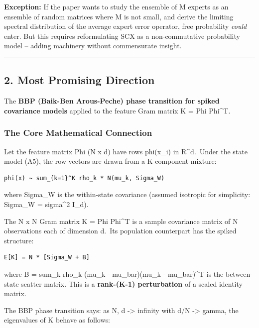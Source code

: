 \documentclass[
  12pt,
]{article}
\begin{document}
\textbf{Exception:} If the paper wants to study the ensemble of M
experts as an ensemble of random matrices where M is not small, and
derive the limiting spectral distribution of the average expert error
operator, free probability \emph{could} enter. But this requires
reformulating SCX as a non-commutative probability model -- adding
machinery without commensurate insight.

\begin{center}\rule{0.5\linewidth}{0.5pt}\end{center}

\subsection{2. Most Promising Direction}\label{most-promising-direction}

The \textbf{BBP (Baik-Ben Arous-Peche) phase transition for spiked
covariance models} applied to the feature Gram matrix K = Phi Phi\^{}T.

\subsubsection{The Core Mathematical
Connection}\label{the-core-mathematical-connection}

Let the feature matrix Phi (N x d) have rows phi(x\_i) in R\^{}d.~Under
the state model (A5), the row vectors are drawn from a K-component
mixture:

\begin{verbatim}
phi(x) ~ sum_{k=1}^K rho_k * N(mu_k, Sigma_W)
\end{verbatim}

where Sigma\_W is the within-state covariance (assumed isotropic for
simplicity: Sigma\_W = sigma\^{}2 I\_d).

The N x N Gram matrix K = Phi Phi\^{}T is a sample covariance matrix of
N observations each of dimension d.~Its population counterpart has the
spiked structure:

\begin{verbatim}
E[K] = N * [Sigma_W + B]
\end{verbatim}

where B = sum\_k rho\_k (mu\_k - mu\_bar)(mu\_k - mu\_bar)\^{}T is the
between-state scatter matrix. This is a \textbf{rank-(K-1) perturbation}
of a scaled identity matrix.

The BBP phase transition says: as N, d -\textgreater{} infinity with d/N
-\textgreater{} gamma, the eigenvalues of K behave as follows:
\end{document}
